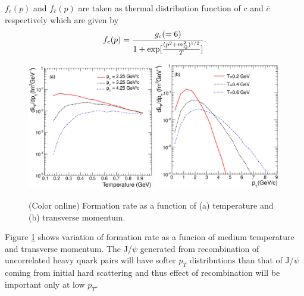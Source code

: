 \documentclass[aps,prc,preprint,superscriptaddress,showpacs,showkeys]{revtex4-1}
\begin{document}
$f_{c}(p)$ and $f_{\bar{c}}(p)$ are taken as thermal distribution function of c and $\bar{c}$ respectively which are given by
\begin{equation}
f_{c}(p)={g_c(=6)  \over 1 + {\rm exp} [ { (p^{2} + m_{Q}^{2} )^{1/2}  \over T }] }.
\end{equation}
\begin{figure}
\includegraphics[width=0.49\textwidth]{Fig4a_FRateVsT.eps}
\includegraphics[width=0.49\textwidth]{Fig4b_FRateVsPt.eps}
\caption{(Color online) Formation rate as a function of (a) temperature and (b) transverse momentum.}
\label{fig:ForRateVsTempAndPt}
\end{figure}
Figure \ref{fig:ForRateVsTempAndPt} shows variation of formation rate as a funcion of medium temperature
and transverse momentum. The J/$\psi$ generated from recombination of uncorrelated heavy quark pairs will have 
softer $p_{T}$ distributions than that of J/$\psi$ coming from initial hard scattering and thus 
effect of recombination will be important only at low $p_T$.
\end{document}
